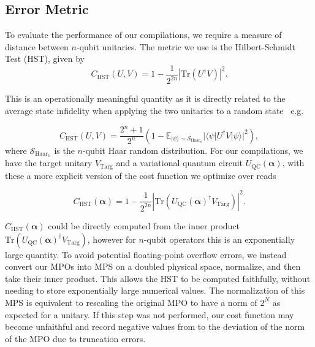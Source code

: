 \documentclass[a4paper,twocolumn,11pt,accepted=2025-06-10]{quantumarticle}
\renewcommand{\vec}[1]{\boldsymbol{#1}}
\begin{document}
\subsection{Error Metric}

To evaluate the performance of our compilations, we require a measure of distance between $n$-qubit unitaries. The metric we use is the Hilbert-Schmidt Test (HST), given by 
\begin{equation}
    C_{\text{HST}}(U, V) = 1-\frac{1}{2^{2n}}|\text{Tr}(U^{\dagger}V)|^2.
\end{equation}

This is an operationally meaningful quantity as it is directly related to the average state infidelity when applying the two unitaries to a random state~\cite{caro2022outofdistribution} e.g.

\begin{equation}
    C_{\text{HST}}(U, V) = \frac{2^n + 1}{2^n}(1 - \mathbb{E}_{|\psi\rangle \sim \mathcal{S}_{\text{Haar}_n}} |\langle\psi|U^{\dagger}V|\psi\rangle|^2),   
\end{equation}
where $\mathcal{S}_{\text{Haar}_n}$ is the $n$-qubit Haar random distribution.
For our compilations, we have the target unitary $V_{\text{Targ}}$ and a variational quantum circuit $U_{\text{QC}}(\vec{\alpha})$, with these a more explicit version of the cost function we optimize over reads

\begin{equation}\label{eq:HSTcost}
    C_{\text{HST}}(\vec{\alpha}) = 1-\frac{1}{2^{2n}}|\text{Tr}(U_{\text{QC}}(\vec{\alpha})^{\dagger}V_{\text{Targ}})|^2.
\end{equation}


$C_{\text{HST}}(\vec{\alpha})$ could be directly computed from the inner product $\text{Tr}(U_{\text{QC}}(\vec{\alpha})^{\dagger}V_{\text{Targ}})$, however for $n$-qubit operators this is an exponentially large quantity. To avoid potential floating-point overflow errors, we instead convert our MPOs into MPS on a doubled physical space, normalize, and then take their inner product. This allows the HST to be computed faithfully, without needing to store exponentially large numerical values. The normalization of this MPS is equivalent to rescaling the original MPO to have a norm of $2^N$ as expected for a unitary. If this step was not performed, our cost function may become unfaithful and record negative values from to the deviation of the norm of the MPO due to truncation errors.
\end{document}
